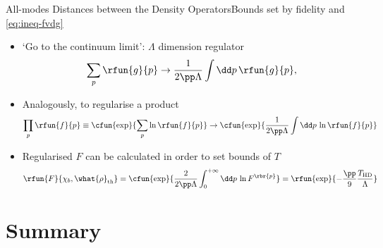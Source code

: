 \documentclass{beamer}
\begin{document}
\begin{frame}[allowframebreaks]{All-modes Distances between the Density 
Operators}{Bounds set by fidelity and \cref{eq:ineq-fvdg}}

\begin{itemize}

\item `Go to the continuum limit': $\Lambda$ dimension regulator
\begin{equation}
\sum_p \rfun{g}{p} \to \frac{1}{2\pp\Lambda} \int \dd p\,\rfun{g}{p},
\end{equation}

\item Analogously, to regularise a product
\begin{equation}
\prod_p \rfun{f}{p} \equiv \cfun{\exp}{\sum_p 
\ln\rfun{f}{p}} \to \cfun{\exp}{\frac{1}{2\pp\Lambda}
\int \dd p\,\ln\rfun{f}{p}}
\end{equation}

\item Regularised $F$ can be calculated \alert{in order to set bounds of $T$}
\begin{equation}
\rfun{F}{\chi_b, \what{\rho}_\text{th}} = 
\cfun{\exp}{\frac{2}{2\pp\Lambda}\int_0^{+\infty}\dd p\,\ln F^{\rbr{p}}} =
\rfun{\exp}{-\frac{\pp}{9} \frac{T_\text{HD}}{\Lambda}}
\end{equation}
\end{itemize}


%

\end{frame}



\section*{Summary}
\end{document}

